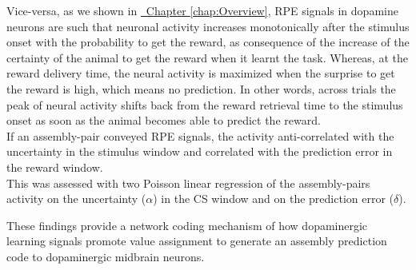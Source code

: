 \begin{itemize}
    Vice-versa, as we shown in \hyperref[chap:Overview]{~Chapter \ref*{chap:Overview}}, RPE signals in dopamine neurons are such that neuronal activity increases monotonically after the stimulus onset with the probability to get the reward, as consequence of the increase of the certainty of the animal to get the reward when it learnt the task. Whereas, at the reward delivery time, the neural activity is maximized when the surprise to get the reward is high, which means no prediction. In other words, across trials the peak of neural activity shifts back from the reward retrieval time to the stimulus onset as soon as the animal becomes able to predict the reward.\\If an assembly-pair conveyed RPE signals, the activity anti-correlated with the uncertainty in the stimulus window and correlated with the prediction error in the reward window.\\This was assessed with two Poisson linear regression of the assembly-pairs activity on the uncertainty ($\alpha$) in the CS window and on the prediction error ($\delta$).
\end{itemize}
  These findings provide a network coding mechanism of how dopaminergic learning signals promote value assignment to generate an assembly prediction code to dopaminergic midbrain neurons. 